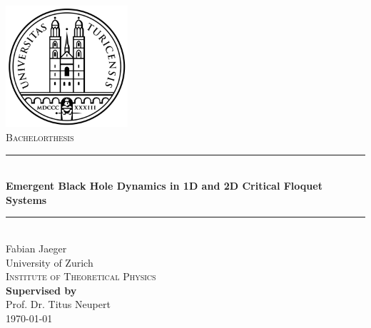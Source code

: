 \documentclass[11pt, a4paper]{article}
\theoremstyle{definition} %
\begin{document}
\begin{titlepage}
    \centering
    \vspace*{0.5 cm}
    \includegraphics[width =0.34\textwidth]{UZH2.png}\\[1.2 cm]
      \textsc{\Large \textsc{Bachelorthesis}}\\[0.5 cm]

    \rule{\linewidth}{0.3 mm} \\[0.4cm]
    { \Large \bfseries Emergent Black Hole Dynamics in 1D and 2D Critical Floquet Systems}\\[0.3 cm]
    \rule{\linewidth}{0.3 mm} \\[1.5 cm]

  
    {\Large Fabian Jaeger}\\[2 cm] 
    
    
    		University of Zurich \\
             \textsc{Institute of Theoretical Physics} \\[1.5cm]
        
             	
    
    
    {\textbf{Supervised by}} \\[0.2cm]
   {\large  Prof. Dr. Titus Neupert} \\[2cm]
    
    {\large \today}\\[2 cm]
 
    \vfill
%    
    
\end{titlepage}
\end{document}
